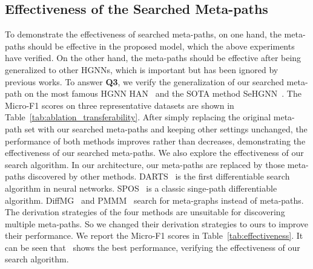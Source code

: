 \subsection{Effectiveness of the Searched Meta-paths}
To demonstrate the effectiveness of searched meta-paths, on one hand, the meta-paths should be effective in the proposed model, which the above experiments have verified. On the other hand, the meta-paths should be effective after being generalized to other HGNNs, which is important but has been ignored by previous works. To answer \textbf{Q3}, we verify the generalization of our searched meta-path on the most famous HGNN HAN~\citep{wang2019heterogeneous} and the SOTA method SeHGNN~\citep{yang2022simple}. The Micro-F1 scores on three representative datasets are shown in Table~\ref{tab:ablation_transferability}. After simply replacing the original meta-path set with our searched meta-paths and keeping other settings unchanged, the performance of both methods improves rather than decreases, demonstrating the effectiveness of our searched meta-paths. We also explore the effectiveness of our search algorithm. In our architecture, our meta-paths are replaced by those meta-paths discovered by other methods. DARTS~\citep{DBLP:conf/iclr/LiuSY19} is the first differentiable search algorithm in neural networks. SPOS~\citep{guo2020single} is a classic singe-path differentiable algorithm.  
DiffMG~\citep{DBLP:conf/kdd/DingYZZ21} and PMMM~\citep{li2022differentiable} search for meta-graphs instead of meta-paths. 
The derivation strategies of the four methods are unsuitable for discovering multiple meta-paths. So we changed their derivation strategies to ours to improve their performance. We report the Micro-F1 scores in Table~\ref{tab:effectiveness}. It can be seen that \model~shows the best performance, verifying the effectiveness of our search algorithm.










